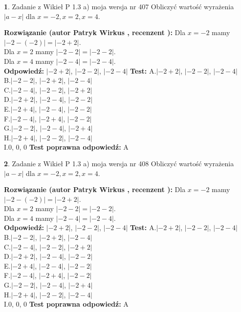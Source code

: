 \documentclass[12pt, a4paper]{article}
\theoremstyle{definition} %
\newtheorem{zad}{}
\newcommand{\zadStart}[1]{\begin{zad}#1\newline}
\newcommand{\zadStop}{\end{zad}}
\newcommand{\rozwStart}[2]{\noindent \textbf{Rozwiązanie (autor #1 , recenzent #2): }\newline}
\newcommand{\rozwStop}{\newline}
\newcommand{\odpStart}{\noindent \textbf{Odpowiedź:}\newline}
\newcommand{\odpStop}{\newline}
\newcommand{\testStart}{\noindent \textbf{Test:}\newline}
\newcommand{\testStop}{\newline}
\newcommand{\kluczStart}{\noindent \textbf{Test poprawna odpowiedź:}\newline}
\newcommand{\kluczStop}{\newline}
\begin{document}
\zadStart{Zadanie z Wikieł P 1.3 a) moja wersja nr 407}
Obliczyć wartość wyrażenia $|a - x|$ dla $x=-2,x=2,x=4$.
\zadStop
\rozwStart{Patryk Wirkus}{}
Dla $x = -2$ mamy $|-2 - (-2)| = |-2 + 2|$.\\
Dla $x = 2$ mamy $|-2 - 2| = |-2 - 2|$.\\
Dla $x = 4$ mamy $|-2 - 4| = |-2 - 4|$.\\
\rozwStop
\odpStart
$|-2 + 2|$, $|-2 - 2|$, $|-2 - 4|$
\odpStop
\testStart
A.$|-2 + 2|$, $|-2 - 2|$, $|-2 - 4|$\\
B.$|-2 - 2|$, $|-2 + 2|$, $|-2 - 4|$\\
C.$|-2 - 4|$, $|-2 - 2|$, $|-2 + 2|$\\
D.$|-2 + 2|$, $|-2 - 4|$, $|-2 - 2|$\\
E.$|-2 + 4|$, $|-2 - 4|$, $|-2 - 2|$\\
F.$|-2 - 4|$, $|-2 + 4|$, $|-2 - 2|$\\
G.$|-2 - 2|$, $|-2 - 4|$, $|-2 + 4|$\\
H.$|-2 + 4|$, $|-2 - 2|$, $|-2 - 4|$\\
I.$0$, $0$, $0$
\testStop
\kluczStart
A
\kluczStop



\zadStart{Zadanie z Wikieł P 1.3 a) moja wersja nr 408}
Obliczyć wartość wyrażenia $|a - x|$ dla $x=-2,x=2,x=4$.
\zadStop
\rozwStart{Patryk Wirkus}{}
Dla $x = -2$ mamy $|-2 - (-2)| = |-2 + 2|$.\\
Dla $x = 2$ mamy $|-2 - 2| = |-2 - 2|$.\\
Dla $x = 4$ mamy $|-2 - 4| = |-2 - 4|$.\\
\rozwStop
\odpStart
$|-2 + 2|$, $|-2 - 2|$, $|-2 - 4|$
\odpStop
\testStart
A.$|-2 + 2|$, $|-2 - 2|$, $|-2 - 4|$\\
B.$|-2 - 2|$, $|-2 + 2|$, $|-2 - 4|$\\
C.$|-2 - 4|$, $|-2 - 2|$, $|-2 + 2|$\\
D.$|-2 + 2|$, $|-2 - 4|$, $|-2 - 2|$\\
E.$|-2 + 4|$, $|-2 - 4|$, $|-2 - 2|$\\
F.$|-2 - 4|$, $|-2 + 4|$, $|-2 - 2|$\\
G.$|-2 - 2|$, $|-2 - 4|$, $|-2 + 4|$\\
H.$|-2 + 4|$, $|-2 - 2|$, $|-2 - 4|$\\
I.$0$, $0$, $0$
\testStop
\kluczStart
A
\kluczStop
\end{document}
